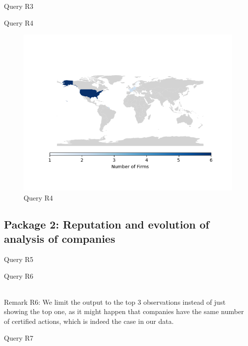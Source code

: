 \begin{table}[!htb]
    \caption{Query R3}
    
\end{table}

\begin{table}[!htb]
    \caption{Query R4}
    
\end{table}

\begin{figure}[h!]
    \centering
    \caption{Query R4}
    \label{fig:R4}
    \includegraphics[width=16cm]{R4_plot.png}
\end{figure}

\clearpage
\newpage

\subsection{Package 2: Reputation and evolution of analysis of companies}
\begin{table}[!htb]
    \caption{Query R5}
	
\end{table}

\begin{table}[!htb]
    \caption{Query R6}
	 \\
    Remark R6: We limit the output to the top 3 observations instead of just showing the top one, as it might happen that
companies have the same number of certified actions, which is indeed the case in our data.
\end{table}



\begin{table}[!htb]
    \caption{Query R7}
	
\end{table}

